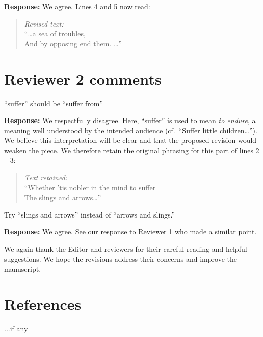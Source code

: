 \documentclass[a4paper,fleqn,10pt]{article}
\newcommand{\revcom}[1]{
  \vspace{2mm}\hspace{2mm} \begin{minipage}[t]{0.96\linewidth}
    \vspace{-6mm}\begin{shaded}
      \begin{minipage}{1.0\linewidth}
        #1
      \end{minipage}
    \end{shaded}
  \end{minipage}}
\newcommand{\response}[1]{\vspace{2mm}\textbf{Response:} #1
\vspace{1mm}}
\begin{document}
\response{
	We agree. Lines 4 and 5 now read:
}

\begin{quote}
	\textit{Revised text:}\\
	``\dots a sea of troubles,\\
	And by opposing end them. \dots''
\end{quote}

\vspace{1em}

\section*{Reviewer 2 comments}

\revcom{``suffer'' should be ``suffer from''}

\response{
	We respectfully disagree. Here, ``suffer'' is used to mean
	\textit{to endure}, a meaning well understood by the intended audience
	(cf.\ ``Suffer little children\dots''). We believe this interpretation will be clear
	and that the proposed revision would weaken the piece. We therefore
	retain the original phrasing for this part of lines 2 -- 3:
}

\begin{quote}
	\textit{Text retained:}\\
	``Whether 'tis nobler in the mind to suffer\\
	The slings and arrows\dots''
\end{quote}

\vspace{1em}

\revcom{Try ``slings and arrows'' instead of ``arrows and slings.'' }

\response{
	We agree. See our response to Reviewer 1 who made a similar point.
}


We again thank the Editor and reviewers for their careful reading and helpful suggestions.
We hope the revisions address their concerns and improve the manuscript.


\section*{References}

...if any
\end{document}
